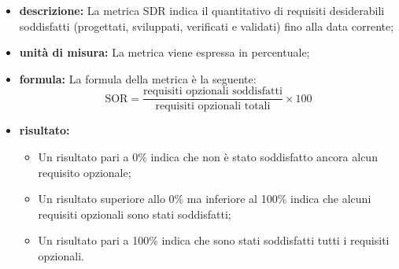 			\begin{itemize}
      			\item \textbf{descrizione: }
				La metrica SDR indica il quantitativo di requisiti desiderabili soddisfatti (progettati, sviluppati, verificati e validati) fino alla data corrente;

				\item \textbf{unità di misura: }
				La metrica viene espressa in percentuale;

				\item \textbf{formula: }
				La formula della metrica è la seguente:
				\[
					\text{SOR} = \frac{\text{requisiti opzionali soddisfatti}}{\text{requisiti opzionali totali}} \times 100
				\]

				\item \textbf{risultato: }
				\begin{itemize}
					\item Un risultato pari a 0\% indica che non è stato soddisfatto ancora alcun requisito opzionale;
					\item Un risultato superiore allo 0\% ma inferiore al 100\% indica che alcuni requisiti opzionali sono stati soddisfatti;
					\item Un risultato pari a 100\% indica che sono stati soddisfatti tutti i requisiti opzionali.
				\end{itemize}
			\end{itemize}






